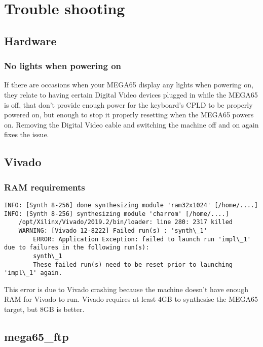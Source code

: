 \lstset{
    basicstyle=\small\ttfamily,
    columns=flexible,
    breaklines=true
}

\chapter{Trouble shooting}

\section{Hardware}
    \subsection{No lights when powering on}
    If there are occasions when your MEGA65 display any lights when powering on, they relate to having certain Digital Video devices plugged in while the MEGA65 is off, that don't provide enough power for the keyboard's CPLD to be properly powered on, but enough to stop it properly resetting when the MEGA65 powers on. Removing the Digital Video cable and switching the machine off and on again fixes the issue.

\section{Vivado}
    \subsection{RAM requirements}
    \begin{tcolorbox}[colback=black,coltext=white]
    \begin{lstlisting}
INFO: [Synth 8-256] done synthesizing module 'ram32x1024' [/home/....]
INFO: [Synth 8-256] synthesizing module 'charrom' [/home/....]
    /opt/Xilinx/Vivado/2019.2/bin/loader: line 280: 2317 killed
    WARNING: [Vivado 12-8222] Failed run(s) : 'synth\_1'
        ERROR: Application Exception: failed to launch run 'impl\_1' due to failures in the following run(s):
        synth\_1
        These failed run(s) need to be reset prior to launching 'impl\_1' again.
    \end{lstlisting}
    \end{tcolorbox}
This error is due to Vivado crashing because the machine doesn't have enough RAM for Vivado to run.
Vivado requires at least 4GB to synthesise the MEGA65 target, but 8GB is better.

\section{mega65\_ftp}

